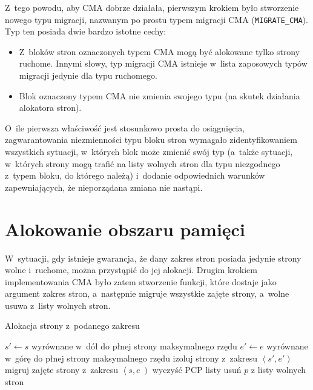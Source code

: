 Z~tego powodu, aby CMA dobrze działała, pierwszym krokiem było
stworzenie nowego typu migracji, nazwanym po prostu typem migracji CMA
(\lstinline|MIGRATE_CMA|).  Typ ten posiada dwie bardzo istotne cechy:

\begin{itemize}
\item Z~bloków stron oznaczonych typem CMA mogą być alokowane tylko
  strony ruchome.  Innymi słowy, typ migracji CMA istnieje w~lista
  zaposowych typów migracji jedynie dla typu ruchomego.
\item Blok oznaczony typem CMA nie zmienia swojego typu (na skutek
  działania alokatora stron).
\end{itemize}

O~ile pierwsza właściwość jest stosunkowo prosta do osiągnięcia,
zagwarantowania niezmienności typu bloku stron wymagało
zidentyfikowaniem wszystkich sytuacji, w~których blok może zmienić
swój typ (a~także sytuacji, w~których strony mogą trafić na listy
wolnych stron dla typu niezgodnego z~typem bloku, do którego należą)
i~dodanie odpowiednich warunków zapewniających, że nieporządana zmiana
nie nastąpi.

\section{Alokowanie obszaru pamięci}\label{sec:alloc-contig-range}

W~sytuacji, gdy istnieje gwarancja, że dany zakres stron posiada
jedynie strony wolne i~ruchome, można przystąpić do jej alokacji.
Drugim krokiem implementowania CMA było zatem stworzenie funkcji,
które dostaje jako argument zakres stron, a~następnie migruje
wszystkie zajęte strony, a~wolne usuwa z~listy wolnych stron.

\begin{algorithm}\label{alg:alloc-contig-range}
\caption{Alokacja strony z~podanego zakresu}
\begin{algorithmic}[1]
    \State $s' \gets s$ wyrównane w~dół do płnej strony maksymalnego rzędu
    \State $e' \gets e$ wyrównane w~górę do płnej strony maksymalnego rzędu
    \State izoluj strony z~zakresu $\left< s', e' \right)$
    \State migruj zajęte strony z~zakresu $\left< s, e~\right)$
    \State wyczyść PCP listy
        \State usuń $p$ z listy wolnych stron
    \EndFor
\EndFunction
\end{algorithmic}
\end{algorithm}
